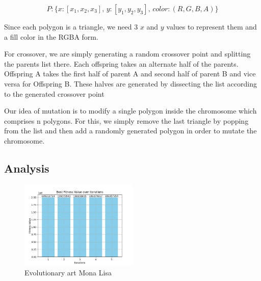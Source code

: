 \documentclass[12pt]{article}
\begin{document}
\[
P: \{ x: [x_1, x_2, x_3],\, y: [y_1, y_2, y_3],\, color: (R, G, B, A) \}
\]

Since each polygon is a triangle, we need 3 \( x \) and \( y \) values to represent them and a fill color in the RGBA form.

For crossover, we are simply generating a random crossover point and splitting the parents list there. Each offspring takes an alternate half of the parents.
Offspring A takes the first half of parent A and second half of parent B and vice versa for Offspring B.
These halves are generated by dissecting the list according to the generated crossover point

Our idea of mutation is to modify a single polygon inside the chromosome which comprises n polygons. 
For this, we simply remove the last triangle by popping from the list and then add a randomly generated polygon in order to mutate the chromosome.
\subsection{Analysis}

\begin{figure}[h]
    \centering
    \includegraphics[width=0.5\textwidth]{images/MonaLisa graph.png}
    \caption{Evolutionary art Mona Lisa}
\end{figure}

\newpage
\end{document}
